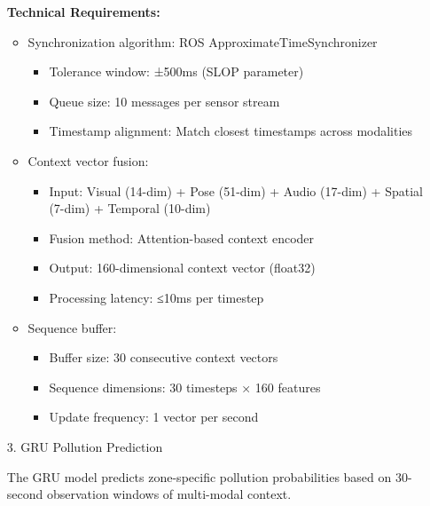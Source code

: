 \documentclass[conference]{IEEEtran}
\begin{document}
\begin{enumerate}
\textbf{Technical Requirements:}
\begin{itemize}
    \item Synchronization algorithm: ROS ApproximateTimeSynchronizer
    \begin{itemize}
        \item Tolerance window: ±500ms (SLOP parameter)
        \item Queue size: 10 messages per sensor stream
        \item Timestamp alignment: Match closest timestamps across modalities
    \end{itemize}
    \item Context vector fusion:
    \begin{itemize}
        \item Input: Visual (14-dim) + Pose (51-dim) + Audio (17-dim) + Spatial (7-dim) + Temporal (10-dim)
        \item Fusion method: Attention-based context encoder
        \item Output: 160-dimensional context vector (float32)
        \item Processing latency: ≤10ms per timestep
    \end{itemize}
    \item Sequence buffer:
    \begin{itemize}
        \item Buffer size: 30 consecutive context vectors
        \item Sequence dimensions: 30 timesteps × 160 features
        \item Update frequency: 1 vector per second
    \end{itemize}
\end{itemize}

\item[3.] GRU Pollution Prediction

The GRU model predicts zone-specific pollution probabilities based on 30-second observation windows of multi-modal context.


\end{enumerate}
\end{document}
